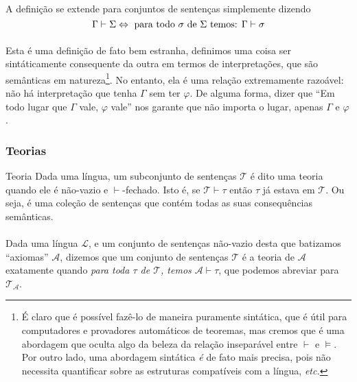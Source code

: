        \paragraph{}
            A definição se extende para conjuntos de sentenças simplemente dizendo
            $$\Gamma\vdash\Sigma\Leftrightarrow\text{ para todo $\sigma$ de $\Sigma$ temos: } \Gamma\vdash\sigma$$

        \paragraph{}
            Esta é uma definição de fato bem estranha, definimos uma coisa ser sintáticamente 
            consequente da outra em termos de interpretações, que são semânticas em 
            natureza\footnote{
                É claro que é possível fazê-lo de maneira puramente sintática, que é útil 
                para computadores e provadores automáticos de teoremas, mas cremos que é 
                uma abordagem que oculta algo da beleza da relação inseparável entre $\vdash$ 
                e $\vDash$.\\
                Por outro lado, uma abordagem sintática {\em é} de fato mais precisa, pois não
                necessita quantificar sobre as estruturas compatíveis com a língua, 
                {\em etc.}
            }. No entanto,
            ela é uma relação extremamente razoável: não há interpretação que tenha $\Gamma$ 
            sem ter $\varphi$. De alguma forma, dizer que ``Em todo lugar que $\Gamma$ vale, 
            $\varphi$ vale'' nos garante que não importa o lugar, apenas $\Gamma$ e $\varphi$.
        
        \subsubsection{Teorias}
        \begin{definition}{Teoria}
                Dada uma língua, um subconjunto de sentenças $\mathcal{T}$ é dito uma teoria
                quando ele é não-vazio e $\vdash$-fechado. Isto é, se $\mathcal{T}\vdash\tau$ 
                então $\tau$ já estava em $\mathcal{T}$. Ou seja, é uma coleção de sentenças 
                que contém todas as suas consequências semânticas.
        \end{definition}
        \paragraph{}
            \newcommand{\theoryof}[1]{\mathcal{T}_{#1}}
            Dada uma língua $\mathcal{L}$, e um conjunto de sentenças não-vazio desta que batizamos ``axiomas'' 
            $\mathcal{A}$, dizemos que um conjunto de sentenças $\mathcal{T}$ é a teoria de 
            $\mathcal{A}$ exatamente quando {\em para toda $\tau$ de $\mathcal{T}$, temos 
            $\mathcal{A}\vdash\tau$}, que podemos abreviar para $\theoryof{\mathcal{A}}$.
